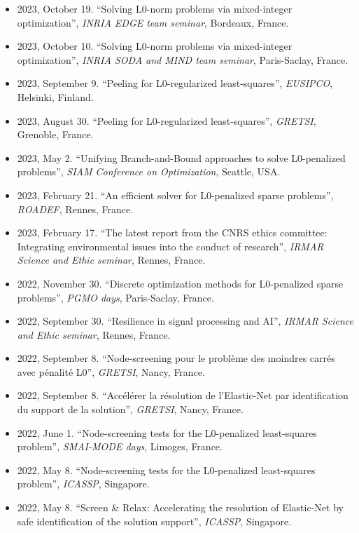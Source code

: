 \begin{itemize}
    \item 2023, October 19. ``Solving L0-norm problems via mixed-integer optimization'', \textit{INRIA EDGE team seminar}, Bordeaux, France.
    \item 2023, October 10. ``Solving L0-norm problems via mixed-integer optimization'', \textit{INRIA SODA and MIND team seminar}, Paris-Saclay, France.
    \item 2023, September 9. ``Peeling for L0-regularized least-squares'', \textit{EUSIPCO}, Helsinki, Finland.
    \item 2023, August 30. ``Peeling for L0-regularized least-squares'', \textit{GRETSI}, Grenoble, France.
    \item 2023, May 2. ``Unifying Branch-and-Bound approaches to solve L0-penalized problems'', \textit{SIAM Conference on Optimization}, Seattle, USA.
    \item 2023, February 21. ``An efficient solver for L0-penalized sparse problems'', \textit{ROADEF}, Rennes, France.
    \item 2023, February 17. ``The latest report from the CNRS ethics committee: Integrating environmental issues into the conduct of research'', \textit{IRMAR Science and Ethic seminar}, Rennes, France.
    \item 2022, November 30. ``Discrete optimization methods for L0-penalized sparse problems'', \textit{PGMO days}, Paris-Saclay, France.
    \item 2022, September 30. ``Resilience in signal processing and AI'', \textit{IRMAR Science and Ethic seminar}, Rennes, France.
    \item 2022, September 8. ``Node-screening pour le problème des moindres carrés avec pénalité L0'', \textit{GRETSI}, Nancy, France.
    \item 2022, September 8. ``Accélérer la résolution de l’Elastic-Net par identification du support de la solution'', \textit{GRETSI}, Nancy, France.
    \item 2022, June 1. ``Node-screening tests for the L0-penalized least-squares problem'', \textit{SMAI-MODE days}, Limoges, France.
    \item 2022, May 8. ``Node-screening tests for the L0-penalized least-squares problem'', \textit{ICASSP}, Singapore.
    \item 2022, May 8. ``Screen \& Relax: Accelerating the resolution of Elastic-Net by safe identification of the solution support'', \textit{ICASSP}, Singapore.
\end{itemize}